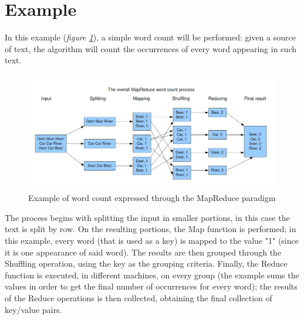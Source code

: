\section{Example}
In this example (\textit{figure \ref{fig:mapreduce_example}}), a simple word count will be performed: given a source of text, the algorithm will count the occurrences of every word appearing in such text.

\begin{figure}[H]
    \centering
    \includegraphics[width=\linewidth]{document/chapters/chapter_4/images/mapreduce_example.png}
    \caption{Example of word count expressed through the MapReduce paradigm \cite{mapreduce_example_site}}
    \label{fig:mapreduce_example}
\end{figure}

The process begins with splitting the input in smaller portions, in this case the text is split by row. On the resulting portions, the Map function is performed; in this example, every word (that is used as a key) is mapped to the value "1" (since it is one appearance of said word). The results are then grouped through the Shuffling operation, using the key as the grouping criteria. Finally, the Reduce function is executed, in different machines, on every group (the example sums the values in order to get the final number of occurrences for every word); the results of the Reduce operations is then collected, obtaining the final collection of key/value pairs.